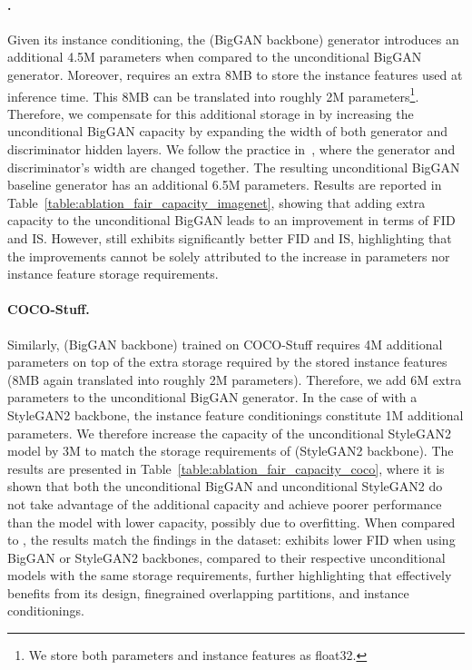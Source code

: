 \paragraph{\ImNet.} Given its instance conditioning, the \ours (BigGAN backbone) generator introduces an additional 4.5M parameters when compared to the unconditional BigGAN generator. Moreover, \ours requires an extra 8MB to store the  instance features used at inference time. This 8MB can be translated into roughly 2M parameters\footnote{We store both parameters and instance features as float32.}. 
Therefore, we compensate for this additional storage in \ours by increasing the unconditional BigGAN capacity by expanding the width of both generator and discriminator hidden layers. We follow the practice in~\cite{brock2018large}, where the generator and discriminator's width are changed together. 
The resulting unconditional BigGAN baseline generator has an additional 6.5M parameters. 
Results are reported in Table~\ref{table:ablation_fair_capacity_imagenet}, showing that adding extra capacity to the unconditional BigGAN leads to an improvement in terms of FID and IS. However, \ours still exhibits significantly better FID and IS, highlighting that the improvements cannot be solely attributed to the increase in parameters nor instance feature storage requirements. 

\paragraph{COCO-Stuff.} Similarly, \ours (BigGAN backbone) trained on COCO-Stuff requires 4M additional parameters on top of the extra storage required by the  stored instance features (8MB again translated into roughly 2M parameters). Therefore, we add 6M extra parameters to the unconditional BigGAN generator. In the case of \ours with a StyleGAN2 backbone, the instance feature conditionings constitute 1M additional parameters. We therefore increase the capacity of the unconditional StyleGAN2 model by 3M to match the storage requirements of \ours (StyleGAN2 backbone). The results are presented in Table~\ref{table:ablation_fair_capacity_coco}, where it is shown that both the unconditional BigGAN and unconditional StyleGAN2 do not take advantage of the additional capacity and achieve poorer performance than the model with lower capacity, possibly due to overfitting. When compared to \ours, the results match the findings in the \ImNet dataset: \ours exhibits lower FID when using BigGAN or StyleGAN2 backbones, compared to their respective unconditional models with the same storage requirements, further highlighting that \ours effectively benefits from its design, finegrained overlapping partitions, and instance conditionings.


